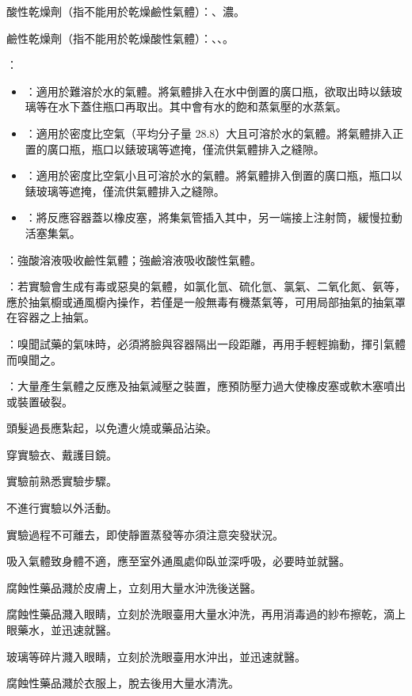 \documentclass[a4paper,12pt]{article}
\begin{document}
\item 酸性乾燥劑（指不能用於乾燥鹼性氣體）：、濃。
\item 鹼性乾燥劑（指不能用於乾燥酸性氣體）：、、。
\eit
{}
\bit
\item {}：
\begin{itemize}
\item {}：適用於難溶於水的氣體。將氣體排入在水中倒置的廣口瓶，欲取出時以錶玻璃等在水下蓋住瓶口再取出。其中會有水的飽和蒸氣壓的水蒸氣。
\item {}：適用於密度比空氣（平均分子量 28.8）大且可溶於水的氣體。將氣體排入正置的廣口瓶，瓶口以錶玻璃等遮掩，僅流供氣體排入之縫隙。
\item {}：適用於密度比空氣小且可溶於水的氣體。將氣體排入倒置的廣口瓶，瓶口以錶玻璃等遮掩，僅流供氣體排入之縫隙。
\item {}：將反應容器蓋以橡皮塞，將集氣管插入其中，另一端接上注射筒，緩慢拉動活塞集氣。
\end{itemize}
\item {}：強酸溶液吸收鹼性氣體；強鹼溶液吸收酸性氣體。
\item {}：若實驗會生成有毒或惡臭的氣體，如氯化氫、硫化氫、氯氣、二氧化氮、氨等，應於抽氣櫥或通風櫥內操作，若僅是一般無毒有機蒸氣等，可用局部抽氣的抽氣罩在容器之上抽氣。
\item {}：嗅聞試藥的氣味時，必須將臉與容器隔出一段距離，再用手輕輕搧動，揮引氣體而嗅聞之。
\item {}：大量產生氣體之反應及抽氣減壓之裝置，應預防壓力過大使橡皮塞或軟木塞噴出或裝置破裂。
\eit
{}
\bit
\item 頭髮過長應紮起，以免遭火燒或藥品沾染。
\item 穿實驗衣、戴護目鏡。
\item 實驗前熟悉實驗步驟。
\item 不進行實驗以外活動。
\item 實驗過程不可離去，即使靜置蒸發等亦須注意突發狀況。
\item 吸入氣體致身體不適，應至室外通風處仰臥並深呼吸，必要時並就醫。
\item 腐蝕性藥品濺於皮膚上，立刻用大量水沖洗後送醫。
\item 腐蝕性藥品濺入眼睛，立刻於洗眼臺用大量水沖洗，再用消毒過的紗布擦乾，滴上眼藥水，並迅速就醫。
\item 玻璃等碎片濺入眼睛，立刻於洗眼臺用水沖出，並迅速就醫。
\item 腐蝕性藥品濺於衣服上，脫去後用大量水清洗。
\end{document}
